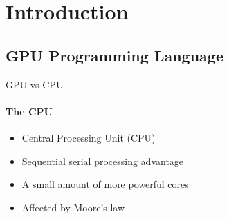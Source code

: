 \section{Introduction}
\subsection{GPU Programming Language}
\begin{frame}{GPU vs CPU}
\framesubtitle{The CPU}
	\begin{itemize}
        \item Central Processing Unit (CPU)
        \item Sequential serial processing advantage
        \item A small amount of more powerful cores
        \item Affected by Moore’s law
    \end{itemize}
\end{frame}


